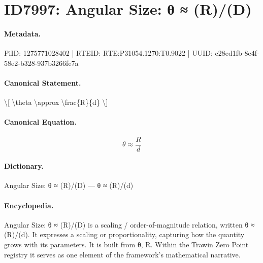 \section*{ID7997: Angular Size: θ ≈ (R)/(D)}
\paragraph{Metadata.}
PiID: 1275771028402 | RTEID: RTE:P31054.1270:T0.9022 | UUID: c28ed1fb-8e4f-58e2-b328-937b3266fe7a

\paragraph{Canonical Statement.}
\textbackslash{}[ \textbackslash{}theta \textbackslash{}approx \textbackslash{}frac\{R\}\{d\} \textbackslash{}]

\paragraph{Canonical Equation.}
\[
\theta \approx \frac{R}{d}
\]

\paragraph{Dictionary.}
Angular Size: θ ≈ (R)/(D) — θ ≈ (R)/(d)

\paragraph{Encyclopedia.}
Angular Size: θ ≈ (R)/(D) is a scaling / order-of-magnitude relation, written θ ≈ (R)/(d). It expresses a scaling or proportionality, capturing how the quantity grows with its parameters. It is built from θ, R. Within the Trawin Zero Point registry it serves as one element of the framework's mathematical narrative.
